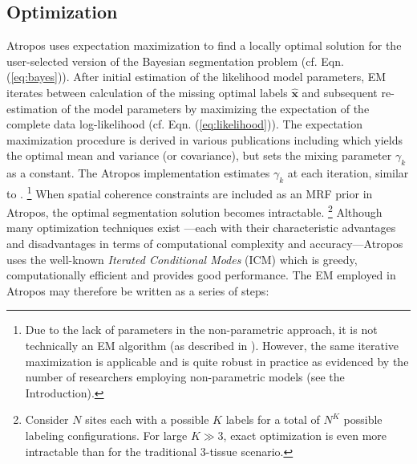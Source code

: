\documentclass[11pt,english]{article}
\begin{document}
\subsection{Optimization}
Atropos uses expectation maximization to find a locally optimal
solution for the user-selected version of the Bayesian segmentation
problem (cf. Eqn. (\ref{eq:bayes})).
After initial estimation of the
likelihood model parameters, EM iterates between calculation of the
missing optimal labels $\hat{\mathbf{x}}$ and subsequent re-estimation of the model
parameters by maximizing the expectation of the complete data
log-likelihood (cf. Eqn. (\ref{eq:likelihood})).  
The expectation maximization procedure is derived in various
publications including \cite{Zhang2001} which yields the optimal mean
and variance (or covariance), but sets the mixing parameter $\gamma_k$
as a constant.  The Atropos implementation estimates $\gamma_k$ at
each iteration, similar to \cite{Ashburner2005}.%
\footnote{
Due to the lack of parameters in the non-parametric approach, it is not technically an EM algorithm (as described in \cite{Wells1996}).  However, the same iterative maximization is applicable and is quite robust in practice as evidenced by the number of researchers employing non-parametric models (see the Introduction).
}  
When spatial coherence constraints are included as an MRF prior in Atropos, the optimal segmentation solution becomes intractable.%
\footnote{
Consider $N$ sites each with a possible $K$ labels for a total of $N^K$ possible labeling configurations. For large $K \gg 3$, exact optimization is even more intractable than for the traditional 3-tissue scenario.
}
Although many optimization techniques exist \citep[see the
introduction in][for a concise summary of the myriad optimization
possibilities]{Marroquin2002}---each with their characteristic
advantages and disadvantages in terms of computational complexity and
accuracy---Atropos uses the well-known {\em Iterated Conditional
  Modes} (ICM)  \citep{Besag1986} which is greedy, computationally
efficient and provides good performance.  The EM employed in
Atropos may therefore be written as a series of steps:
\end{document}
